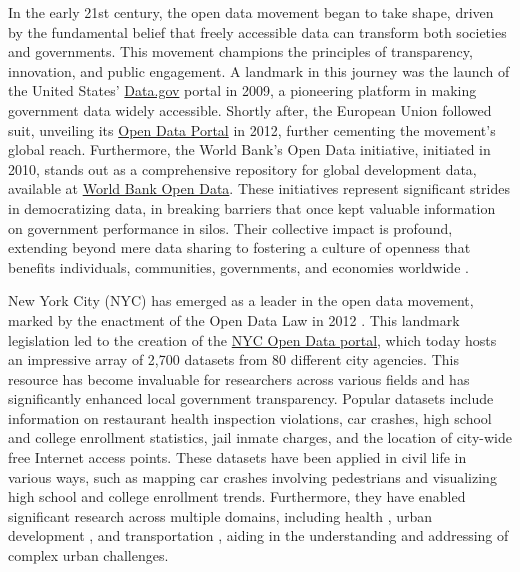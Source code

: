 \documentclass[12pt, titlepage]{article}
\begin{document}
In the early 21st century,
the open data movement began to take shape, driven by the
fundamental belief that freely accessible data can transform 
both societies and governments. This movement champions the principles
of transparency, innovation, and public engagement. 
A landmark in this journey was the launch of the United States'
\href{https://www.data.gov}{Data.gov} portal in 2009, a pioneering
platform in making government data widely accessible. Shortly after,
the European Union followed suit, unveiling its
\href{https://data.europa.eu/euodp}{Open Data Portal} in 2012, further
cementing the movement's global reach. Furthermore, the World Bank's Open
Data initiative, initiated in 2010, stands out as a comprehensive
repository for global development data, available at
\href{https://data.worldbank.org}{World Bank Open Data}. 
These initiatives represent significant strides in democratizing data, 
in breaking barriers that once kept valuable information 
on government performance in silos. Their collective impact 
is profound, extending beyond mere data sharing to 
fostering a culture of openness that benefits individuals, 
communities, governments, and economies worldwide 
\citep{barns2016mine, wang2016adoption}.


New York City (NYC) has emerged as a leader in the open data movement,
marked by the enactment of the Open Data Law in 2012
\citep{zuiderwijk2014open}. This landmark legislation led to the
creation of the \href{https://opendata.cityofnewyork.us}{NYC Open Data
  portal}, which today hosts an impressive array of 2,700 datasets
from 80 different city agencies. This resource has become invaluable
for researchers across various fields and has significantly enhanced
local government transparency. Popular datasets include information on
restaurant health inspection violations, car crashes, high school and
college enrollment statistics, jail inmate charges, and the location
of city-wide free Internet access points. These datasets have been
applied in civil life in various ways, such as mapping car crashes
involving pedestrians and visualizing high school and college
enrollment trends. Furthermore, they have enabled significant research
across multiple domains, including health \citep{cantor2018facets,
  shankar2021data}, urban development \citep{neves2020impacts}, and
transportation \citep{gerte2019understanding}, aiding in the
understanding and addressing of complex urban challenges.
\end{document}

